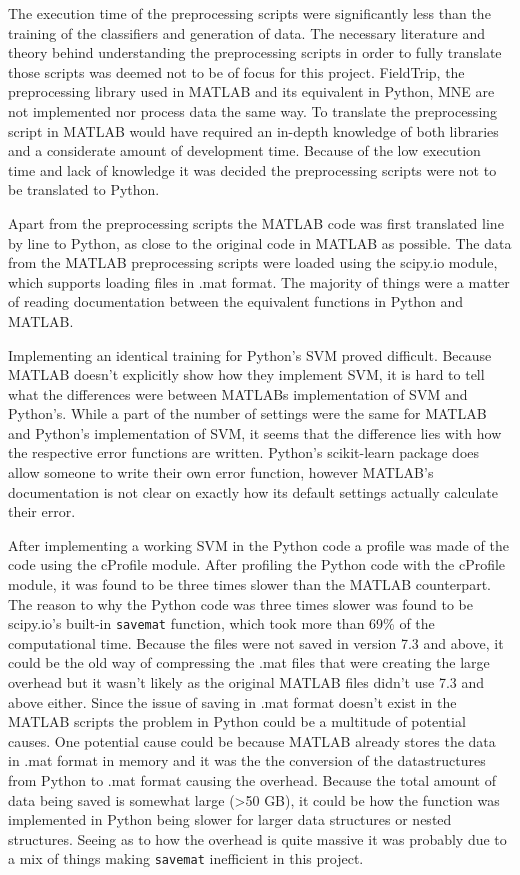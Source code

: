 \documentclass[12pt, a4paper]{article}
\begin{document}
The execution time of the preprocessing scripts were significantly less than the training of the classifiers and generation of data. 
The necessary literature and theory behind understanding the preprocessing scripts in order to fully translate those scripts was deemed not to be of focus for this project.
FieldTrip, the preprocessing library used in MATLAB and its equivalent in Python, MNE are not implemented nor process data the same way.
To translate the preprocessing script in MATLAB would have required an in-depth knowledge of both libraries and a considerate amount of development time.
Because of the low execution time and lack of knowledge it was decided the preprocessing scripts were not to be translated to Python.

Apart from the preprocessing scripts the MATLAB code was first translated line by line to Python, as close to the original code in MATLAB as possible.
The data from the MATLAB preprocessing scripts were loaded using the scipy.io module, which supports loading files in .mat format.
The majority of things were a matter of reading documentation between the equivalent functions in Python and MATLAB.

Implementing an identical training for Python's SVM proved difficult.
Because MATLAB doesn't explicitly show how they implement SVM, it is hard to tell what the differences were between MATLABs implementation of SVM and Python's.
While a part of the number of settings were the same for MATLAB and Python's implementation of SVM, it seems that the difference lies with how the respective error functions are written.
Python's scikit-learn package does allow someone to write their own error function, however MATLAB's documentation is not clear on exactly how its default settings actually calculate their error. %

After implementing a working SVM in the Python code a profile was made of the code using the cProfile module.
After profiling the Python code with the cProfile module, it was found to be three times slower than the MATLAB counterpart.
The reason to why the Python code was three times slower was found to be scipy.io's built-in \texttt{savemat} function, which took more than 69\% of the computational time.
Because the files were not saved in version 7.3 and above, it could be the old way of compressing the .mat files that were creating the large overhead but it wasn't likely as the original MATLAB files didn't use 7.3 and above either.
Since the issue of saving in .mat format doesn't exist in the MATLAB scripts the problem in Python could be a multitude of potential causes.
One potential cause could be because MATLAB already stores the data in .mat format in memory and it was the the conversion of the datastructures from Python to .mat format causing the overhead.
Because the total amount of data being saved is somewhat large (>50 GB), it could be how the function was implemented in Python being slower for larger data structures or nested structures. 
Seeing as to how the overhead is quite massive it was probably due to a mix of things making \texttt{savemat} inefficient in this project.
\end{document}

